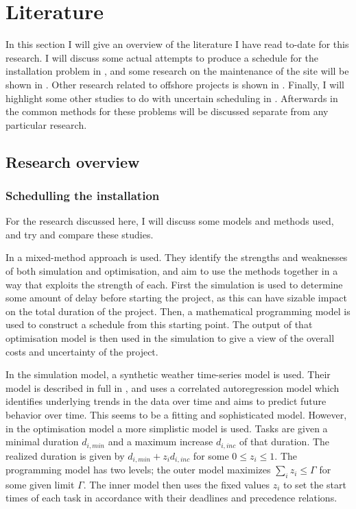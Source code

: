 \documentclass[a4paper,12pt]{article}
\begin{document}
\pagebreak

\section{Literature} \label{s:lit}
In this section I will give an overview of the literature I have read to-date for this research. I will discuss some actual attempts to produce a schedule for the installation problem in , and some research on the maintenance of the site will be shown in . Other research related to offshore projects is shown in . Finally, I will highlight some other studies to do with uncertain scheduling in .  Afterwards in  the common methods for these problems will be discussed separate from any particular research. 

\subsection{Research overview} \label{ss:rese}

\subsubsection{Schedulling the installation} \label{sss:sched}
For the research discussed here, I will discuss some models and methods used, and try and compare these studies. 

\bigskip

In \cite{barlow2018mixed} a mixed-method approach is used. They identify the strengths and weaknesses of both simulation and optimisation, and aim to use the methods together in a way that exploits the strength of each. First the simulation is used to determine some amount of delay before starting the project, as this can have sizable impact on the total duration of the project. Then, a mathematical programming model is used to construct a schedule from this starting point. The output of that optimisation model is then used in the simulation to give a view of the overall costs and uncertainty of the project. 

In the simulation model, a synthetic weather time-series model is used. Their model is described in full in \cite{dinwoodie2014operational} , and uses a correlated autoregression model which identifies underlying trends in the data over time and aims to predict future behavior over time. This seems to be a fitting and sophisticated model. However, in the optimisation model a more simplistic model is used. Tasks are given a minimal duration $d_{i, min}$ and a maximum increase $d_{i, inc}$ of that duration. The realized duration is given by $d_{i,  min} + z_i d_{i, inc}$ for some $0 \leq z_i \leq 1$. The programming model has two levels; the outer model maximizes $\sum_i z_i \leq \Gamma$ for some given limit $\Gamma$. The inner model then uses the fixed values $z_i$ to set the start times of each task in accordance with their deadlines and precedence relations. 
\end{document}

